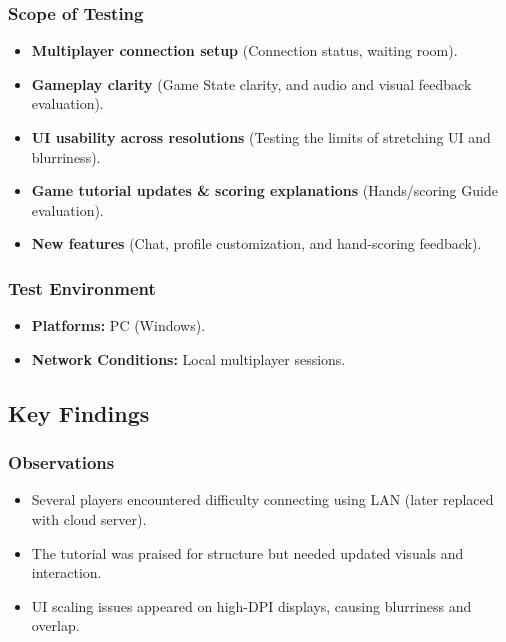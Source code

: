 \documentclass[12pt, titlepage]{article}
\begin{document}
\subsubsection{Scope of Testing}
\begin{itemize}
    \item \textbf{Multiplayer connection setup} (Connection status, waiting room).
    \item \textbf{Gameplay clarity} (Game State clarity, and audio and visual feedback evaluation).
    \item \textbf{UI usability across resolutions} (Testing the limits of stretching UI and blurriness).
    \item \textbf{Game tutorial updates \& scoring explanations} (Hands/scoring Guide evaluation).
    \item \textbf{New features} (Chat, profile customization, and hand-scoring feedback).
\end{itemize}

\subsubsection{Test Environment}
\begin{itemize}
    \item \textbf{Platforms:} PC (Windows).
    \item \textbf{Network Conditions:} Local multiplayer sessions.
\end{itemize}

\subsection{Key Findings}

\subsubsection{Observations}
\begin{itemize}
    \item Several players encountered difficulty connecting using LAN (later replaced with cloud server).
    \item The tutorial was praised for structure but needed updated visuals and interaction.
    \item UI scaling issues appeared on high-DPI displays, causing blurriness and overlap.
\end{itemize}
\end{document}
